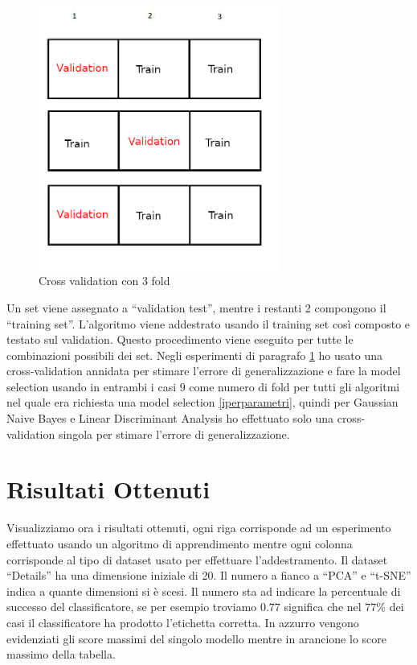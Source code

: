 \documentclass[12pt,italian]{report}
\begin{document}
\begin{figure}[h]
	\centering
	\includegraphics[width = 79mm]{immagini/cross-validation}
	\caption{Cross validation con 3 fold}
\end{figure}
Un set viene assegnato a ``validation test'', mentre i restanti 2 compongono il ``training set''. L'algoritmo viene addestrato usando il training set così composto e testato sul  validation. Questo procedimento viene eseguito per tutte le combinazioni possibili dei set.
Negli esperimenti di paragrafo \ref{sec:risultati} ho usato una cross-validation annidata per stimare l'errore di generalizzazione e fare la model selection usando in entrambi i casi 9 come numero di fold per tutti gli algoritmi nel quale era richiesta una model selection \ref{iperparametri}, quindi per Gaussian Naive Bayes e Linear Discriminant Analysis ho effettuato solo una cross-validation singola per stimare l'errore di generalizzazione.




\section{Risultati Ottenuti}
\label{sec:risultati}
Visualizziamo ora i risultati ottenuti, ogni riga corrisponde ad un esperimento effettuato usando un algoritmo di apprendimento mentre ogni colonna corrisponde al tipo di dataset usato per effettuare l'addestramento. Il dataset ``Details'' ha una dimensione iniziale di 20. Il numero a fianco a ``PCA'' e ``t-SNE'' indica a quante dimensioni si è scesi. Il numero sta ad indicare la percentuale di successo del classificatore, se per esempio troviamo $0.77$ significa che nel $77\%$ dei casi il classificatore ha prodotto l'etichetta corretta.
In azzurro vengono evidenziati gli score massimi del singolo modello mentre in arancione lo score massimo della tabella.
\end{document}
